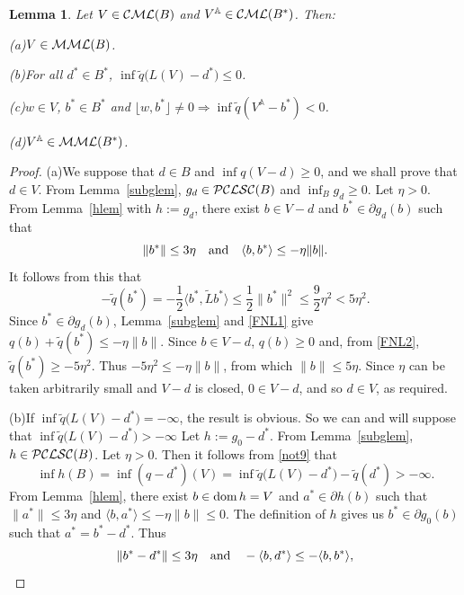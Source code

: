 \documentclass[letterpaper]{article}
\theoremstyle{plain}
\newtheorem{lemma}[theorem]{Lemma}
\theoremstyle{definition}
\numberwithin{equation}{section}
\newcommand{\A}{{\mathbb A}}
\newcommand{\bra}[2]{\langle#1,#2\rangle}
\newcommand{\Bra}[2]{\big\langle#1,#2\big\rangle}
\newcommand{\CML}{{\cal CML}}
\newcommand{\dom}{\hbox{\rm dom}}
\newcommand{\half}{{\textstyle\frac{1}{2}}}
\newcommand{\infn}{\inf\nolimits}
\newcommand{\lr}{\Longrightarrow}
\newcommand{\Lt}{{\wt L}}
\newcommand{\MML}{{\cal MML}}
\newcommand{\PCLSC}{{\cal PCLSC}}
\newcommand{\qt}{\wt q}
\newcommand{\quand}{\quad\hbox{and}\quad}
\newcommand{\wt}{\widetilde}
\newcommand{\xbra}[2]{\lfloor#1,#2\rfloor}
\newcommand{\Lem}{Lemma~\ref}
\begin{document}
\begin{lemma}\label{FNLlem}
Let $V \in \CML(B)$ and $V^\A \in \CML(B^*)$.   Then:\par\noindent
{\rm(a)}\enspace $V \in \MML(B)$.\par\noindent
{\rm(b)}\enspace For all $d^* \in B^*$, $\infn\qt\big(L(V) - d^*\big) \le 0$.\par\noindent
{\rm(c)}\enspace $w \in V$, $b^* \in B^*$ and $\xbra{w}{b^*} \ne 0 \lr \inf\qt(V^\A - b^*) < 0$.\par\noindent
{\rm(d)}\enspace $V^\A\in \MML(B^*)$.
\end{lemma}
\begin{proof}
(a)\enspace We suppose that $d \in B$ and $\inf q(V - d) \ge 0$, and we shall prove that $d\in V$.   From \Lem{subglem}, $g_d \in \PCLSC(B)$ and $\infn_Bg_d  \ge 0$.
%
Let $\eta > 0$. From \Lem{hlem} with $h := g_d$, there exist $b \in  V - d$ and $b^* \in \partial g_d(b)$ such that
\begin{equation}\label{FNL1}
\|b^*\| \le 3\eta\hbox{\quad and\quad}\bra{b}{b^*} \le -\eta\|b\|.
\end{equation} 
%
It follows from this that
\begin{equation}\label{FNL2}
- \qt(b^*) =  - \half\Bra{b^*}{\Lt b^*}  \le \half\|b^*\|^2 \le \textstyle\frac{9}{2}\eta^2 < 5\eta^2.
\end{equation}
%
Since $b^* \in \partial g_d(b)$, \Lem{subglem} and \eqref{FNL1} give $q(b) + \qt(b^*) \le -\eta\|b\|$. Since $b \in V - d$, $q(b) \ge 0$ and, from \eqref{FNL2}, $\qt(b^*) \ge - 5\eta^2$.   Thus $-5\eta^2 \le -\eta\|b\|$, from which $\|b\| \le 5\eta$.   Since $\eta$ can be taken arbitrarily small and $V - d$ is closed, $0 \in V - d$, and so $d \in V$, as required.
\par
(b)\enspace If $\infn\qt\big(L(V) - d^*\big) = -\infty$, the result is obvious.   So we can and will suppose that $\infn\qt\big(L(V) - d^*\big) > -\infty$  
Let $h:= g_0 - d^*$.   From \Lem{subglem}, $h \in \PCLSC(B)$. Let $\eta > 0$.   Then it follows from \eqref{not9} that  
%
$$\inf h(B) = \inf(q - {d^*})(V) =\infn\qt\big(L(V) - d^*\big)- \qt(d^*) > -\infty.$$
%
From \Lem{hlem}, there exist $b \in \dom\,h = V$ and $a^* \in \partial h(b)$ such that\break $\|a^*\| \le 3\eta$ and $\bra{b}{a^*} \le -\eta\|b\| \le 0$.   The definition of $h$ gives us $b^* \in \partial g_0(b)$ such that $a^* = b^* - d^*$.   Thus
\begin{equation}\label{FNL4}
\|b^* - d^*\| \le 3\eta \quand -\bra{b}{d^*} \le -\bra{b}{b^*},

\end{equation}
\end{proof}
\end{document}
